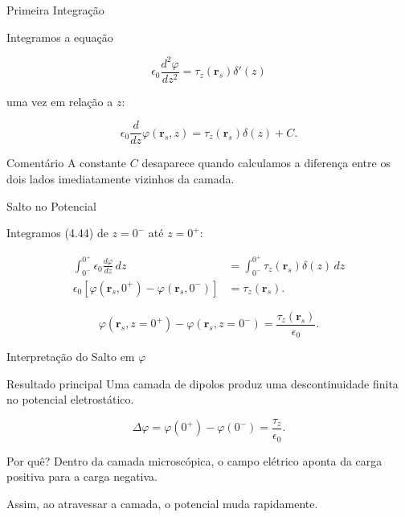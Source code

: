 \documentclass[aspectratio=169]{beamer}
\begin{document}
\begin{frame}{Primeira Integração}

Integramos a equação

\[
\epsilon_0
\frac{d^2\varphi}{dz^2}
=
\tau_z(\mathbf r_s)\delta'(z)
\]

uma vez em relação a \(z\):

\begin{eqbox}
\begin{equation}
\epsilon_0
\frac{d}{dz}
\varphi(\mathbf r_s,z)
=
\tau_z(\mathbf r_s)\delta(z)
+
C.
\tag{4.44}
\label{eq:4.44}
\end{equation}
\end{eqbox}

\begin{mybox}{Comentário}
A constante \(C\) desaparece quando calculamos a diferença entre os dois lados imediatamente vizinhos da camada.
\end{mybox}

\end{frame}

\begin{frame}{Salto no Potencial}

Integramos (4.44) de \(z=0^-\) até \(z=0^+\):

\begin{align}
\int_{0^-}^{0^+}
\epsilon_0
\frac{d\varphi}{dz}\,dz
&=
\int_{0^-}^{0^+}
\tau_z(\mathbf r_s)\delta(z)\,dz
\\[0.2cm]
\epsilon_0
\left[
\varphi(\mathbf r_s,0^+)
-
\varphi(\mathbf r_s,0^-)
\right]
&=
\tau_z(\mathbf r_s).
\end{align}

\begin{eqbox}
\begin{equation}
\varphi(\mathbf r_s,z=0^+)
-
\varphi(\mathbf r_s,z=0^-)
=
\frac{\tau_z(\mathbf r_s)}{\epsilon_0}.
\tag{4.45}
\label{eq:4.45}
\end{equation}
\end{eqbox}

\end{frame}

\begin{frame}{Interpretação do Salto em \(\varphi\)}

\begin{mybox}{Resultado principal}
Uma camada de dipolos produz uma descontinuidade finita no potencial eletrostático.
\end{mybox}

\[
\Delta\varphi
=
\varphi(0^+)-\varphi(0^-)
=
\frac{\tau_z}{\epsilon_0}.
\]

\begin{mybox}{Por quê?}
Dentro da camada microscópica, o campo elétrico aponta da carga positiva para a carga negativa.

Assim, ao atravessar a camada, o potencial muda rapidamente.
\end{mybox}

\end{frame}
\end{document}
